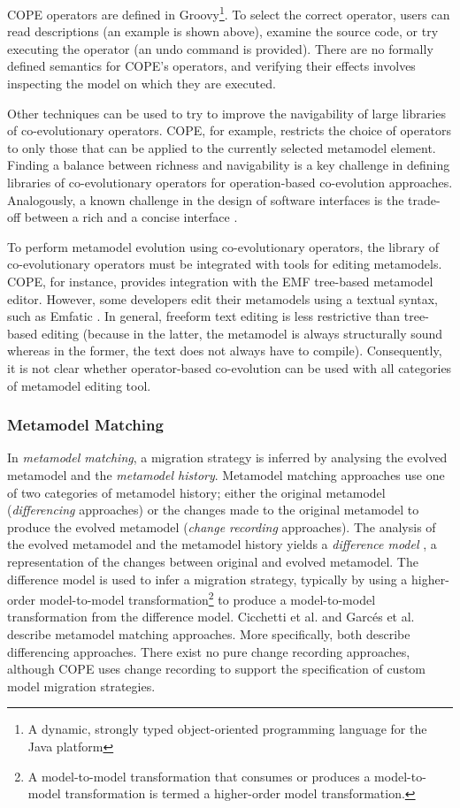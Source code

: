 COPE operators are defined in Groovy\footnote{A dynamic, strongly typed object-oriented programming language for the Java platform}. To select the correct operator, users can read descriptions (an example is shown above), examine the source code, or try executing the operator (an undo command is provided). There are no formally defined semantics for COPE's operators, and verifying their effects involves inspecting the model on which they are executed.

Other techniques can be used to try to improve the navigability of large libraries of co-evolutionary operators. COPE, for example, restricts the choice of operators to only those that can be applied to the currently selected metamodel element. Finding a balance between richness and navigability is a key challenge in defining libraries of co-evolutionary operators for operation-based co-evolution approaches. Analogously, a known challenge in the design of software interfaces is the trade-off between a rich and a concise interface \cite{bloch05apis}.

To perform metamodel evolution using co-evolutionary operators, the library of co-evolutionary operators must be integrated with tools for editing metamodels. COPE, for instance, provides integration with the EMF tree-based metamodel editor. However, some developers edit their metamodels using a textual syntax, such as Emfatic \cite{emfatic}. In general, freeform text editing is less restrictive than tree-based editing (because in the latter, the metamodel is always structurally sound whereas in the former, the text does not always have to compile). Consequently, it is not clear whether operator-based co-evolution can be used with all categories of metamodel editing tool.

\subsubsection{Metamodel Matching}
\label{subsec:metamodel_matching}
In \emph{metamodel matching}, a migration strategy is inferred by analysing the evolved metamodel and the \emph{metamodel history}. Metamodel matching approaches use one of two categories of metamodel history; either the original metamodel (\emph{differencing} approaches) or the changes made to the original metamodel to produce the evolved metamodel (\emph{change recording} approaches). The analysis of the evolved metamodel and the metamodel history yields a \emph{difference model} \cite{cicchetti08automating}, a representation of the changes between original and evolved metamodel. The difference model is used to infer a migration strategy, typically by using a higher-order model-to-model transformation\footnote{A model-to-model transformation that consumes or produces a model-to-model transformation is termed a higher-order model transformation.} to produce a model-to-model transformation from the difference model. Cicchetti et al. \cite{cicchetti08automating} and Garc{\'e}s et al. \cite{garces09managing} describe metamodel matching approaches. More specifically, both describe differencing approaches. There exist no pure change recording approaches, although COPE \cite{herrmannsdoerfer09cope} uses change recording to support the specification of custom model migration strategies.

